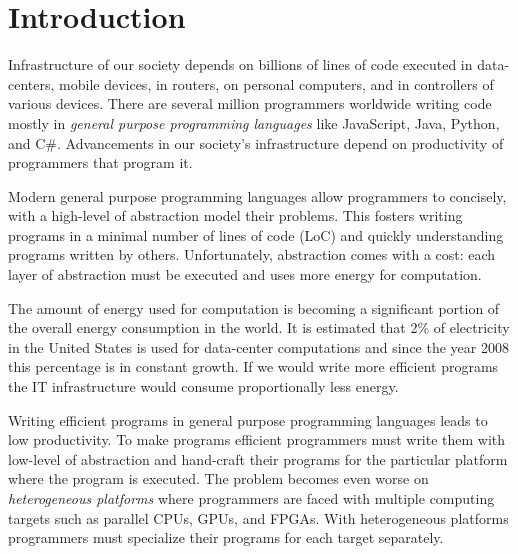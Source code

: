 \chapter{Introduction}
\label{sct:introduction}

Infrastructure of our society depends on billions of lines of code executed in data-centers,
 mobile devices, in routers, on personal computers, and in controllers of various devices. There are
 several million programmers worldwide writing code mostly in \emph{general purpose programming languages}
 like JavaScript, Java, Python, and C\#. Advancements in our society's infrastructure depend on
 productivity of programmers that program it.

Modern general purpose programming languages allow programmers to concisely, with a high-level of
 abstraction model their problems. This fosters writing programs in a minimal
 number of lines of code (LoC) and quickly understanding programs written by others.
 Unfortunately, abstraction comes with a cost: each layer of abstraction must be
 executed and uses more energy for computation.

The amount of energy used for computation is becoming a significant portion of the overall energy consumption in the world.
 It is estimated that 2\%  of electricity in the United States is used for data-center computations and since
 the year 2008 this percentage is in constant growth. If we would write more efficient
 programs the IT infrastructure would consume proportionally less energy.

Writing efficient programs in general purpose programming languages leads to low productivity.
 To make programs efficient programmers must write them with low-level of abstraction and hand-craft their
 programs for the particular platform where the program is executed. The problem
 becomes even worse on \emph{heterogeneous platforms} where programmers are faced
 with multiple computing targets such as parallel CPUs, GPUs, and FPGAs. With heterogeneous
 platforms programmers must specialize their programs for each target separately.

